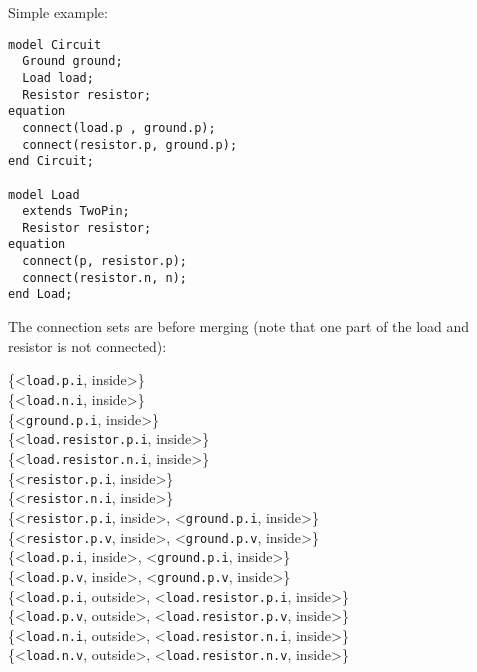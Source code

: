 \begin{example}
Simple example:
\begin{lstlisting}[language=modelica]
model Circuit
  Ground ground;
  Load load;
  Resistor resistor;
equation
  connect(load.p , ground.p);
  connect(resistor.p, ground.p);
end Circuit;

model Load
  extends TwoPin;
  Resistor resistor;
equation
  connect(p, resistor.p);
  connect(resistor.n, n);
end Load;
\end{lstlisting}
The connection sets are before merging (note that one part of the load and resistor is not connected):

\{\textless{}\lstinline!load.p.i!, inside\textgreater{}\}\\
\{\textless{}\lstinline!load.n.i!, inside\textgreater{}\}\\
\{\textless{}\lstinline!ground.p.i!, inside\textgreater{}\}\\
\{\textless{}\lstinline!load.resistor.p.i!, inside\textgreater{}\}\\
\{\textless{}\lstinline!load.resistor.n.i!, inside\textgreater{}\}\\
\{\textless{}\lstinline!resistor.p.i!, inside\textgreater{}\}\\
\{\textless{}\lstinline!resistor.n.i!, inside\textgreater{}\}\\
\{\textless{}\lstinline!resistor.p.i!, inside\textgreater{}, \textless{}\lstinline!ground.p.i!, inside\textgreater{}\}\\
\{\textless{}\lstinline!resistor.p.v!, inside\textgreater{}, \textless{}\lstinline!ground.p.v!, inside\textgreater{}\}\\
\{\textless{}\lstinline!load.p.i!, inside\textgreater{}, \textless{}\lstinline!ground.p.i!, inside\textgreater{}\}\\
\{\textless{}\lstinline!load.p.v!, inside\textgreater{}, \textless{}\lstinline!ground.p.v!, inside\textgreater{}\}\\
\{\textless{}\lstinline!load.p.i!, outside\textgreater{}, \textless{}\lstinline!load.resistor.p.i!, inside\textgreater{}\}\\
\{\textless{}\lstinline!load.p.v!, outside\textgreater{}, \textless{}\lstinline!load.resistor.p.v!, inside\textgreater{}\}\\
\{\textless{}\lstinline!load.n.i!, outside\textgreater{}, \textless{}\lstinline!load.resistor.n.i!, inside\textgreater{}\}\\
\{\textless{}\lstinline!load.n.v!, outside\textgreater{}, \textless{}\lstinline!load.resistor.n.v!, inside\textgreater{}\}


\end{example}
